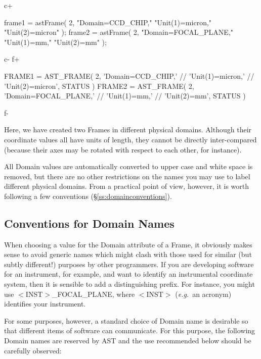 \documentclass[twoside,11pt]{starlink}
\providecommand{\secref}[1]{\S\ref{#1}}
\begin{document}
c+
\small
\begin{terminalv}
frame1 = astFrame( 2, "Domain=CCD_CHIP,"
                      "Unit(1)=micron,"
                      "Unit(2)=micron" );
frame2 = astFrame( 2, "Domain=FOCAL_PLANE,"
                      "Unit(1)=mm,"
                      "Unit(2)=mm" );
\end{terminalv}
\normalsize
c-
f+
\small
\begin{terminalv}
      FRAME1 = AST_FRAME( 2, 'Domain=CCD_CHIP,' //
                             'Unit(1)=micron,' //
                             'Unit(2)=micron', STATUS )
      FRAME2 = AST_FRAME( 2, 'Domain=FOCAL_PLANE,' //
                             'Unit(1)=mm,' //
                             'Unit(2)=mm', STATUS )
\end{terminalv}
\normalsize
f-

Here, we have created two Frames in different physical
domains. Although their coordinate values all have units of length,
they cannot be directly inter-compared (because their axes may be
rotated with respect to each other, for instance).

All Domain values are automatically converted to upper case and white
space is removed, but there are no other restrictions on the names you
may use to label different physical domains. From a practical point of
view, however, it is worth following a few conventions
(\secref{ss:domainconventions}).

\subsection{\label{ss:domainconventions}Conventions for Domain Names}

When choosing a value for the Domain attribute of a Frame, it
obviously makes sense to avoid generic names which might clash with
those used for similar (but subtly different!) purposes by other
programmers. If you are developing software for an instrument, for
example, and want to identify an instrumental coordinate system, then
it is sensible to add a distinguishing prefix. For instance, you might
use $<$INST$>$\_FOCAL\_PLANE, where $<$INST$>$ (\emph{e.g.}\ an
acronym) identifies your instrument.

For some purposes, however, a standard choice of Domain name is
desirable so that different items of software can communicate. For
this purpose, the following Domain names are reserved by AST and the
use recommended below should be carefully observed:
\end{document}
